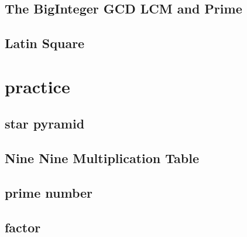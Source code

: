     \subsection{The BigInteger GCD LCM and Prime}
        
    \subsection{Latin Square}
        

\section{practice}
    \subsection{star pyramid}
            
    \subsection{Nine Nine Multiplication Table}
        
    \subsection{prime number}
        
    \subsection{factor}
        